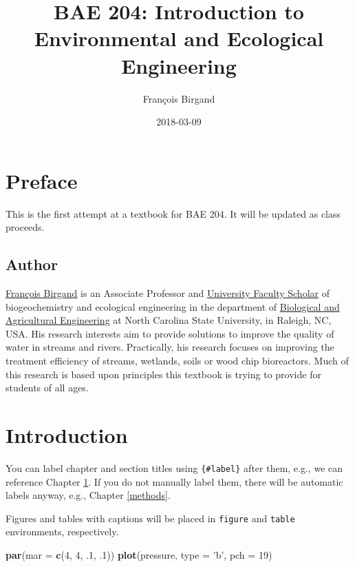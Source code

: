 \documentclass[]{book}
\title{BAE 204: Introduction to Environmental and Ecological Engineering}
\author{François Birgand}
\date{2018-03-09}
\newenvironment{Shaded}{\begin{snugshade}}{\end{snugshade}}
\newcommand{\KeywordTok}[1]{\textcolor[rgb]{0.13,0.29,0.53}{\textbf{#1}}}
\newcommand{\DataTypeTok}[1]{\textcolor[rgb]{0.13,0.29,0.53}{#1}}
\newcommand{\DecValTok}[1]{\textcolor[rgb]{0.00,0.00,0.81}{#1}}
\newcommand{\StringTok}[1]{\textcolor[rgb]{0.31,0.60,0.02}{#1}}
\newcommand{\NormalTok}[1]{#1}
\theoremstyle{definition}
\theoremstyle{definition}
\theoremstyle{definition}
\theoremstyle{remark}
\begin{document}
\maketitle

{
\setcounter{tocdepth}{1}
\tableofcontents
}
\chapter*{Preface}\label{preface}

This is the first attempt at a textbook for BAE 204. It will be updated
as class proceeds.

\section*{Author}\label{author}

\href{https://francoisbirgand.github.io}{François Birgand} is an
Associate Professor and
\href{https://provost.ncsu.edu/strategic-initiatives/university-faculty-scholars/}{University
Faculty Scholar} of biogeochemistry and ecological engineering in the
department of \href{https://www.bae.ncsu.edu/}{Biological and
Agricultural Engineering} at North Carolina State University, in
Raleigh, NC, USA. His research interests aim to provide solutions to
improve the quality of water in streams and rivers. Practically, his
research focuses on improving the treatment efficiency of streams,
wetlands, soils or wood chip bioreactors. Much of this research is based
upon principles this textbook is trying to provide for students of all
ages.

\chapter{Introduction}\label{intro}

You can label chapter and section titles using \texttt{\{\#label\}}
after them, e.g., we can reference Chapter \ref{intro}. If you do not
manually label them, there will be automatic labels anyway, e.g.,
Chapter \ref{methods}.

Figures and tables with captions will be placed in \texttt{figure} and
\texttt{table} environments, respectively.

\begin{Shaded}
\begin{Highlighting}[]
\KeywordTok{par}\NormalTok{(}\DataTypeTok{mar =} \KeywordTok{c}\NormalTok{(}\DecValTok{4}\NormalTok{, }\DecValTok{4}\NormalTok{, .}\DecValTok{1}\NormalTok{, .}\DecValTok{1}\NormalTok{))}
\KeywordTok{plot}\NormalTok{(pressure, }\DataTypeTok{type =} \StringTok{'b'}\NormalTok{, }\DataTypeTok{pch =} \DecValTok{19}\NormalTok{)}
\end{Highlighting}
\end{Shaded}
\end{document}
